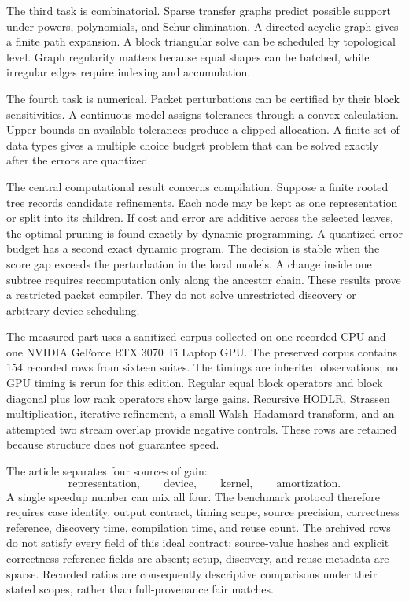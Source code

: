 The third task is combinatorial. Sparse transfer graphs predict possible support under powers, polynomials, and Schur elimination. A directed acyclic graph gives a finite path expansion. A block triangular solve can be scheduled by topological level. Graph regularity matters because equal shapes can be batched, while irregular edges require indexing and accumulation.

The fourth task is numerical. Packet perturbations can be certified by their block sensitivities. A continuous model assigns tolerances through a convex calculation. Upper bounds on available tolerances produce a clipped allocation. A finite set of data types gives a multiple choice budget problem that can be solved exactly after the errors are quantized.

The central computational result concerns compilation. Suppose a finite rooted tree records candidate refinements. Each node may be kept as one representation or split into its children. If cost and error are additive across the selected leaves, the optimal pruning is found exactly by dynamic programming. A quantized error budget has a second exact dynamic program. The decision is stable when the score gap exceeds the perturbation in the local models. A change inside one subtree requires recomputation only along the ancestor chain. These results prove a restricted packet compiler. They do not solve unrestricted discovery or arbitrary device scheduling.

The measured part uses a sanitized corpus collected on one recorded CPU and one NVIDIA GeForce RTX 3070 Ti Laptop GPU. The preserved corpus contains 154 recorded rows from sixteen suites. The timings are inherited observations; no GPU timing is rerun for this edition. Regular equal block operators and block diagonal plus low rank operators show large gains. Recursive HODLR, Strassen multiplication, iterative refinement, a small Walsh--Hadamard transform, and an attempted two stream overlap provide negative controls. These rows are retained because structure does not guarantee speed.

The article separates four sources of gain:
\[
\text{representation},
\qquad
\text{device},
\qquad
\text{kernel},
\qquad
\text{amortization}.
\]
A single speedup number can mix all four. The benchmark protocol therefore requires case identity, output contract, timing scope, source precision, correctness reference, discovery time, compilation time, and reuse count. The archived rows do not satisfy every field of this ideal contract: source-value hashes and explicit correctness-reference fields are absent; setup, discovery, and reuse metadata are sparse. Recorded ratios are consequently descriptive comparisons under their stated scopes, rather than full-provenance fair matches.

